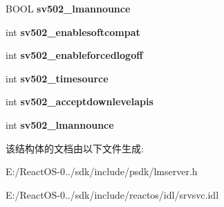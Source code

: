 \begin{DoxyCompactItemize}
B\+O\+OL {\bfseries sv502\+\_\+lmannounce}
\item 
\mbox{\label{struct___s_e_r_v_e_r___i_n_f_o__502_a8b761e14521bfcd2a698cc6bf9b0adcd}} 
int {\bfseries sv502\+\_\+enablesoftcompat}
\item 
\mbox{\label{struct___s_e_r_v_e_r___i_n_f_o__502_a9abf7f85d9b3487314861eda83a9d534}} 
int {\bfseries sv502\+\_\+enableforcedlogoff}
\item 
\mbox{\label{struct___s_e_r_v_e_r___i_n_f_o__502_a178905f5ee8903621f97d538bb45e775}} 
int {\bfseries sv502\+\_\+timesource}
\item 
\mbox{\label{struct___s_e_r_v_e_r___i_n_f_o__502_aafefb22bc5bebaa7e38b3991b79c800f}} 
int {\bfseries sv502\+\_\+acceptdownlevelapis}
\item 
\mbox{\label{struct___s_e_r_v_e_r___i_n_f_o__502_adbc593d5f003411cac7a3ba13c375c44}} 
int {\bfseries sv502\+\_\+lmannounce}
\end{DoxyCompactItemize}


该结构体的文档由以下文件生成\+:\begin{DoxyCompactItemize}
\item 
E\+:/\+React\+O\+S-\/0../sdk/include/psdk/lmserver.\+h\item 
E\+:/\+React\+O\+S-\/0../sdk/include/reactos/idl/srvsvc.\+idl\end{DoxyCompactItemize}
